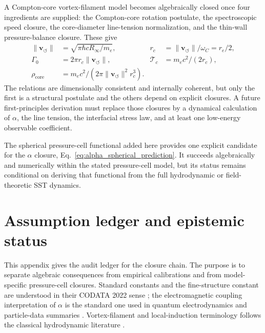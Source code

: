 \documentclass[aps,pra,preprint,longbibliography,nofootinbib]{revtex4-2}
\newcommand{\vnorm}{\lVert\mathbf{v}_{\!\boldsymbol{\circlearrowleft}}\rVert} %
\newcommand{\rhocore}{\rho_{\mathrm{core}}}      %
\newcommand{\rc}{r_c}                            %
\newcommand{\Tc}{\mathcal{T}_c}                  %
\newcommand{\Gz}{\Gamma_0}                       %
\begin{document}
A Compton-core vortex-filament model becomes algebraically closed once
four ingredients are supplied: the Compton-core rotation postulate, the
spectroscopic speed closure, the core-diameter line-tension
normalization, and the thin-wall pressure-balance closure.  These give
\begin{align*}
  \vnorm  &= \sqrt{\pi\hbar cR_\infty/m_e},
  &\rc    &= \vnorm/\omega_C = r_e/2, \\
  \Gz     &= 2\pi\rc\vnorm,
  &\Tc    &= m_ec^2/(2\rc),\\
  \rhocore &= m_ec^2/(2\pi\vnorm^2\rc^3).
\end{align*}
The relations are dimensionally consistent and internally coherent, but
only the first is a structural postulate and the others depend on
explicit closures.  A future first-principles derivation must replace
those closures by a dynamical calculation of $\alpha$, the line tension,
the interfacial stress law, and at least one low-energy observable
coefficient.


The spherical pressure-cell functional added here provides one explicit
candidate for the $\alpha$ closure,
Eq.~\eqref{eq:alpha_spherical_prediction}.  It succeeds algebraically and
numerically within the stated pressure-cell model, but its status remains
conditional on deriving that functional from the full hydrodynamic or
field-theoretic SST dynamics.



\appendix

\section{Assumption ledger and epistemic status}
\label{app:assumptions}

This appendix gives the audit ledger for the closure chain.  The purpose is
to separate algebraic consequences from empirical calibrations and from
model-specific pressure-cell closures.  Standard constants and the
fine-structure constant are understood in their CODATA 2022 sense
\cite{MohrTaylor2022}; the electromagnetic coupling interpretation of
$\alpha$ is the standard one used in quantum electrodynamics and particle-data
summaries \cite{PeskinSchroeder1995,PDG2022}.  Vortex-filament and
local-induction terminology follows the classical hydrodynamic literature
\cite{Batchelor1967,Saffman1992,Donnelly1991}.
\end{document}
